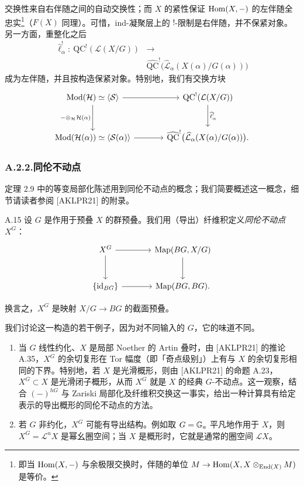 交换性来自右伴随之间的自动交换性；而 $X$ 的紧性保证 $\operatorname{Hom}(X,-)$ 的左伴随全忠实\footnote{即当 $\operatorname{Hom}(X,-)$ 与余极限交换时，伴随的单位 $M\to\operatorname{Hom}(X,X\otimes_{\operatorname{End}(X)}M)$ 是等价。}（$F(X)$ 同理）。可惜，ind-凝聚层上的 $!$-限制是右伴随，并不保紧对象。另一方面，重整化之后
\[
\begin{aligned}
\widehat\ell^{!}_\alpha\colon\ \mathrm{QC}^{!}(\mathcal L(X/G)) &\longrightarrow\\
&\widehat{\mathrm{QC}}^{!}\bigl(\widehat{\mathcal L}_\alpha(X(\alpha)/G(\alpha))\bigr)
\end{aligned}
\]
成为左伴随，并且按构造保紧对象。特别地，我们有交换方块
\[
\begin{tikzcd}[column sep=large,row sep=large]
\Mod(\mathcal H)\simeq\langle\mathcal S\rangle \arrow[r] \arrow[d, "-\otimes_{\mathcal H}\mathcal H(\alpha)"'] & \mathrm{QC}^{!}(\mathcal L(X/G)) \arrow[d, "\widehat\ell^{!}_\alpha"]\\
\Mod(\mathcal H(\alpha))\simeq\langle\mathcal S(\alpha)\rangle \arrow[r] & \widehat{\mathrm{QC}}^{!}\bigl(\widehat{\mathcal L}_\alpha(X(\alpha)/G(\alpha))\bigr).
\end{tikzcd}
\]

\subsubsection*{A.2.2.\quad 同伦不动点}

定理 2.9 中的等变局部化陈述用到同伦不动点的概念；我们简要概述这一概念，细节请读者参阅 [AKLPR21] 的附录。

\begin{defn}{A.15}\label{defn:a5-04-9}
设 $G$ 是作用于预叠 $X$ 的群预叠。我们用（导出）纤维积定义\emph{同伦不动点} $X^G$：
\[
\begin{tikzcd}[column sep=large,row sep=large]
X^G \arrow[r] \arrow[d] & \Map(BG,X/G) \arrow[d]\\
\{\mathrm{id}_{BG}\} \arrow[r] & \Map(BG,BG).
\end{tikzcd}
\]
\end{defn}

换言之，$X^G$ 是映射 $X/G\to BG$ 的截面预叠。

我们讨论这一构造的若干例子，因为对不同输入的 $G$，它的味道不同。
\begin{enumerate}[(1)]
\item 当 $G$ 线性约化、$X$ 是局部 Noether 的 Artin 叠时，由 [AKLPR21] 的推论 A.35，$X^G$ 的余切复形在 Tor 幅度（即「奇点级别」）上有与 $X$ 的余切复形相同的下界。特别地，若 $X$ 是光滑概形，则由 [AKLPR21] 的命题 A.23，$X^G\subset X$ 是光滑闭子概形，从而 $X^G$ 就是 $X$ 的经典 $G$-不动点。这一观察，结合 $(-)^{hG}$ 与 Zariski 局部化及纤维积交换这一事实，给出一种计算具有给定表示的导出概形的同伦不动点的方法。
\item 若 $G$ 非约化，$X^G$ 可能有导出结构。例如取 $G=\mathbb{G}_a$ 平凡地作用于 $X$，则 $X^G=\mathcal L^uX$ 是幂幺圈空间；当 $X$ 是概形时，它就是通常的圈空间 $\mathcal L X$。
\end{enumerate}

